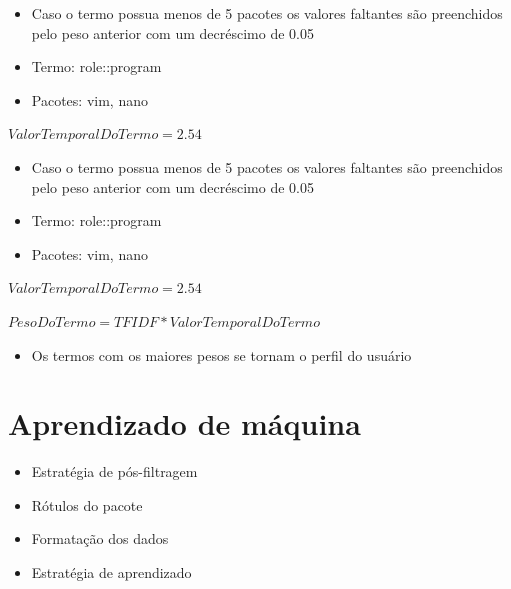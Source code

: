 \begin{frame}
    \begin{itemize}
        \item Caso o termo possua menos de 5 pacotes os valores faltantes são
    preenchidos pelo peso anterior com um decréscimo de 0.05
        \item Termo: role::program
        \item Pacotes: vim, nano
    \end{itemize}

    $ValorTemporalDoTermo = 2.54$
\end{frame}

\begin{frame}
    \begin{itemize}
        \item Caso o termo possua menos de 5 pacotes os valores faltantes são
    preenchidos pelo peso anterior com um decréscimo de 0.05
        \item Termo: role::program
        \item Pacotes: vim, nano
    \end{itemize}

    $ValorTemporalDoTermo = 2.54$

    $PesoDoTermo = TFIDF * ValorTemporalDoTermo$
\end{frame}

\begin{frame}
    \begin{itemize}
        \item Os termos com os maiores pesos se tornam o perfil do usuário
    \end{itemize}
\end{frame}


\section{Aprendizado de máquina} %

\begin{frame}

    \begin{itemize}
        \item Estratégia de pós-filtragem
        \item Rótulos do pacote
        \item Formatação dos dados
        \item Estratégia de aprendizado
    \end{itemize}

\end{frame}

